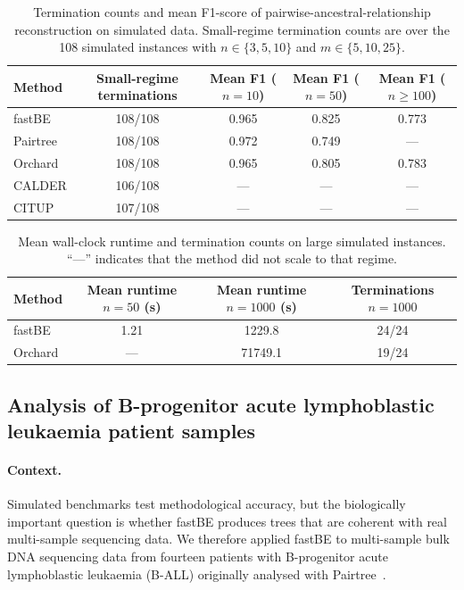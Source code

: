 \documentclass[11pt]{article}
\begin{document}
\begin{table}[htbp]
\centering
\caption{Termination counts and mean F1-score of pairwise-ancestral-relationship reconstruction on simulated data. Small-regime termination counts are over the 108 simulated instances with $n\in\{3,5,10\}$ and $m\in\{5,10,25\}$.}
\label{tab:sim_accuracy}
\begin{tabular}{lcccc}
\toprule
Method & Small-regime terminations & Mean F1 ($n=10$) & Mean F1 ($n=50$) & Mean F1 ($n\geq 100$) \\
\midrule
fastBE   & 108/108 & 0.965 & 0.825 & 0.773 \\
Pairtree & 108/108 & 0.972 & 0.749 & --- \\
Orchard  & 108/108 & 0.965 & 0.805 & 0.783 \\
CALDER   & 106/108 & ---   & ---   & --- \\
CITUP    & 107/108 & ---   & ---   & --- \\
\bottomrule
\end{tabular}
\end{table}

\begin{table}[htbp]
\centering
\caption{Mean wall-clock runtime and termination counts on large simulated instances. ``---'' indicates that the method did not scale to that regime.}
\label{tab:sim_runtime}
\begin{tabular}{lccc}
\toprule
Method & Mean runtime $n=50$ (s) & Mean runtime $n=1000$ (s) & Terminations $n=1000$ \\
\midrule
fastBE  & 1.21 & 1229.8  & 24/24 \\
Orchard & ---  & 71749.1 & 19/24 \\
\bottomrule
\end{tabular}
\end{table}

\subsection{Analysis of B-progenitor acute lymphoblastic leukaemia patient samples}

\paragraph{Context.}
Simulated benchmarks test methodological accuracy, but the biologically important question is whether fastBE produces trees that are coherent with real multi-sample sequencing data. We therefore applied fastBE to multi-sample bulk DNA sequencing data from fourteen patients with B-progenitor acute lymphoblastic leukaemia (B-ALL) originally analysed with Pairtree~\citep{wintersinger2022pairtree}.
\end{document}
